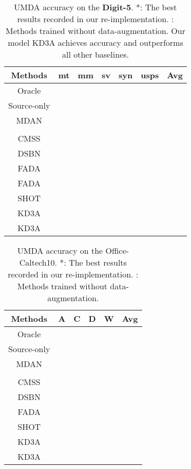 \documentclass{article}
\begin{document}
\begin{table*}[h!]
\setlength\extrarowheight{4.5pt}
\centering
\begin{tabular}{c|ccccc|c}
Methods & mt & mm & sv & syn & usps & Avg \\ 
\hline
Oracle &         &           &          &      &  &     \\
Source-only       &         &           &          &       &    &      \\ \hline
 MDAN    &  &       &          &     &     &     \\
  &         &           &           &           &       &     \\ 
\hline
 CMSS  &      &        &        &        &    &     \\ 
\hline 
 DSBN       &         &           &          &           &      &     \\ 
\hline
FADA  &      &           &          &           &       &     \\
\cline{2-7}
FADA    &      &           &          &           &       &     \\
\cline{2-7}
SHOT &  &  &  &  &  & \\
\cline{2-7}
KD3A   &        &       &         &            &     &   \\
\cline{2-7}
KD3A   &        &       &         &            &     &     \\ 
 \hline
\end{tabular}
\caption{UMDA accuracy  on the \textbf{Digit-5}. *: The best results recorded in our re-implementation. \dag: Methods trained without data-augmentation. Our model KD3A achieves  accuracy and outperforms all other baselines.}
\label{table:digit5}
\end{table*}
\begin{table*}[h!]
\setlength\extrarowheight{4.5pt}
\centering
\begin{tabular}{c|cccc|c}
Methods & A & C & D & W  & Avg \\ 
\hline
Oracle &         &           &          &      &     \\
Source-only       &         &           &          &       &      \\ \hline
 MDAN    &  &       &          &      &     \\
  &         &           &           &          &     \\ 
\hline
CMSS  &         &           &   &    &    \\
\hline
 DSBN        &         &           &          &       &     \\ 
\hline
FADA   &      &           &          &        &     \\
\cline{2-6}
SHOT &  &  &  &  & \\
\cline{2-6}
KD3A &        &       &            &     &     \\ 
\cline{2-6}
KD3A   &        &       &            &     &     \\ 
 \hline
\end{tabular}
\caption{UMDA accuracy  on the Office-Caltech10. *: The best results recorded in our re-implementation. \dag: Methods trained without data-augmentation.}
\label{table:office}
\end{table*}
\end{document}
